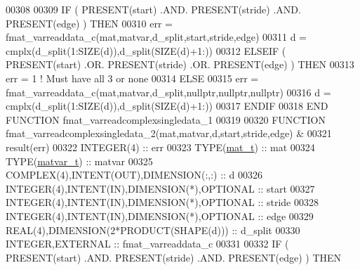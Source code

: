 \begin{DoxyCode}
00308 
00309     \textcolor{keywordflow}{IF} ( \textcolor{keyword}{PRESENT}(start) .AND. \textcolor{keyword}{PRESENT}(stride) .AND. \textcolor{keyword}{PRESENT}(edge) ) \textcolor{keywordflow}{THEN}
00310         err = fmat\_varreaddata\_c(mat,matvar,d\_split,start,stride,edge)
00311         d = cmplx(d\_split(1:\textcolor{keyword}{SIZE}(d)),d\_split(\textcolor{keyword}{SIZE}(d)+1:))
00312     \textcolor{keywordflow}{ELSEIF} ( \textcolor{keyword}{PRESENT}(start) .OR. \textcolor{keyword}{PRESENT}(stride) .OR. \textcolor{keyword}{PRESENT}(edge) ) \textcolor{keywordflow}{THEN}
00313         err = 1    \textcolor{comment}{! Must have all 3 or none}
00314     \textcolor{keywordflow}{ELSE}
00315         err = fmat\_varreaddata\_c(mat,matvar,d\_split,nullptr,nullptr,nullptr)
00316         d = cmplx(d\_split(1:\textcolor{keyword}{SIZE}(d)),d\_split(\textcolor{keyword}{SIZE}(d)+1:))
00317 \textcolor{keywordflow}{    ENDIF}
00318 \textcolor{keyword}{END FUNCTION }fmat\_varreadcomplexsingledata\_1
00319 
00320 \textcolor{keyword}{FUNCTION }fmat\_varreadcomplexsingledata\_2(mat,matvar,d,start,stride,edge) &
00321                                                              result(err)
00322     \textcolor{keywordtype}{INTEGER(4)}                                  :: err
00323     \textcolor{keywordtype}{TYPE}(\hyperlink{group___m_a_t_gab0fc888f5a5d79943b16284b1f91c2e8}{mat\_t})                                 :: mat
00324     \textcolor{keywordtype}{TYPE}(\hyperlink{group___m_a_t_structmatvar__t}{matvar\_t})                              :: matvar
00325     \textcolor{keywordtype}{COMPLEX(4)},\textcolor{keywordtype}{INTENT(OUT)},\textcolor{keywordtype}{DIMENSION(:,:)}   :: d
00326     \textcolor{keywordtype}{INTEGER(4)},\textcolor{keywordtype}{INTENT(IN)},\textcolor{keywordtype}{DIMENSION(*)},\textcolor{keywordtype}{OPTIONAL} :: start
00327     \textcolor{keywordtype}{INTEGER(4)},\textcolor{keywordtype}{INTENT(IN)},\textcolor{keywordtype}{DIMENSION(*)},\textcolor{keywordtype}{OPTIONAL} :: stride
00328     \textcolor{keywordtype}{INTEGER(4)},\textcolor{keywordtype}{INTENT(IN)},\textcolor{keywordtype}{DIMENSION(*)},\textcolor{keywordtype}{OPTIONAL} :: edge
00329     \textcolor{keywordtype}{REAL(4)},\textcolor{keywordtype}{DIMENSION(2*PRODUCT(SHAPE(d)))} :: d\_split
00330     \textcolor{keywordtype}{INTEGER},\textcolor{keywordtype}{EXTERNAL}                            :: fmat\_varreaddata\_c
00331 
00332     \textcolor{keywordflow}{IF} ( \textcolor{keyword}{PRESENT}(start) .AND. \textcolor{keyword}{PRESENT}(stride) .AND. \textcolor{keyword}{PRESENT}(edge) ) \textcolor{keywordflow}{THEN}

\end{DoxyCode}
